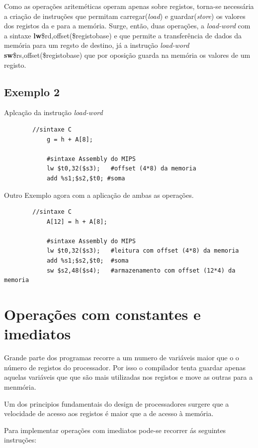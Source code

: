 \documentclass[10pt,a4paper]{book}
\begin{document}
	  Como as operações ariteméticas operam apenas sobre registos, torna-se necessária  a criação de instruções que permitam carregar(\textit{load}) e guardar(\textit{store}) os valores dos registos da e para a memória.
	  Surge, então, duas operações, a \textit{load-word} com a sintaxe \textbf{lw}\$rd,offset(\$registobase) e que permite a transferência de dados da memória para um regsto de destino, já a instrução \textit{load-word}  \textbf{sw}\$rs,offset(\$registobase) 	  que por oposição guarda na memória os valores de um registo.

	   \subsection{Exemplo 2}
	      Aplcação da instrução \textit{load-word}

	      \begin{lstlisting}
		//sintaxe C
	        g = h + A[8];

	        #sintaxe Assembly do MIPS
	        lw $t0,32($s3);   #offset (4*8) da memoria
	        add %s1;$s2,$t0; #soma
	      \end{lstlisting}

	      Outro Exemplo agora com a aplicação de ambas as operações.

	     \begin{lstlisting}
		//sintaxe C
	        A[12] = h + A[8];

	        #sintaxe Assembly do MIPS
	        lw $t0,32($s3);   #leitura com offset (4*8) da memoria
	        add %s1;$s2,$t0;  #soma
	        sw $s2,48($s4);	  #armazenamento com offset (12*4) da memoria
	      \end{lstlisting}

	  \section {Operações com constantes e imediatos}

	      Grande parte dos programas recorre a um numero de variáveis maior que o o número de registos do processador. Por isso o compilador tenta guardar apenas aquelas variáveis que
	      que são mais utilizadas nos registos e move as outras para a menmória.

	      Um dos principios fundamentais do design de processadores surgere que a velocidade de acesso aos registos é maior que a de acesso à memória.

	      Para implementar operações com imediatos pode-se recorrer ás seguintes instruções:
\end{document}
